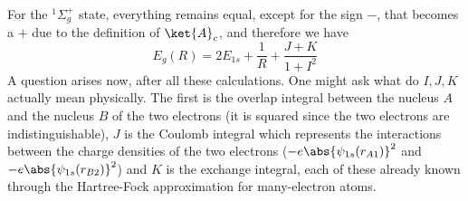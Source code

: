 \documentclass[a4paper, 11pt]{book}
\newcommand{\1}{\opr{\mathds{1}}}
\newcommand{\term}[3][]{^{#3}#2_{#1}}
\theoremstyle{plain}
\begin{document}
	For the $\term[g]{\Sigma^+}{1}$ state, everything remains equal, except for the sign $-$, that becomes a $+$ due to the definition of $\ket{A}_c$, and therefore we have
	\begin{equation}
		E_g(R)=2E_{1s}+\frac{1}{R}+\frac{J+K}{1+I^2}
		\label{eq:geradeenergyketa}
	\end{equation}
	A question arises now, after all these calculations. One might ask what do $I,J,K$ actually mean physically. The first is the overlap integral between the nucleus $A$ and the nucleus $B$ of the two electrons (it is squared since the two electrons are indistinguishable), $J$ is the Coulomb integral which represents the interactions between the charge densities of the two electrons ($-e\abs{\psi_{1s}(r_{A1})}^2$ and $-e\abs{\psi_{1s}(r_{B2})}^2$) and $K$ is the exchange integral, each of these already known through the Hartree-Fock approximation for many-electron atoms.
\end{document}
